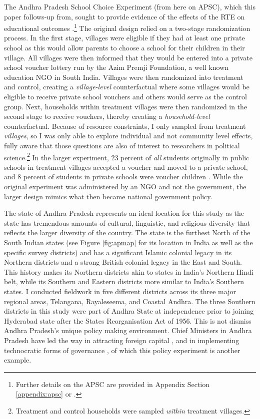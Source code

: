 \documentclass[hidelinks, 12pt, titlepage]{article}
\begin{document}
	The Andhra Pradesh School Choice Experiment (from here on APSC), which this paper follows-up from, sought to provide evidence of the effects of the RTE on educational outcomes \citep[1018-19]{Muralidharan2015}.\footnote{Further details on the APSC are provided in Appendix Section \ref{appendix:apsc} or \cite{Muralidharan2015}.}  The original design relied on a two-stage randomization process.  In the first stage, villages were eligible if they had at least one private school as this would allow parents to choose a school for their children in their village.  All villages were then informed that they would be entered into a private school voucher lottery run by the Azim Premji Foundation, a well known education NGO in South India.  Villages were then randomized into treatment and control, creating a \emph{village-level} counterfactual where some villages would be eligible to receive private school vouchers and others would serve as the control group.  Next, households within treatment villages were then randomized in the second stage to receive vouchers, thereby creating a \emph{household-level} counterfactual.  Because of resource constraints, I only sampled from treatment \emph{villages}, so I was only able to explore individual and not community level effects, fully aware that those questions are also of interest to researchers in political science.\footnote{Treatment and control households were sampled \emph{within} treatment villages.}  In the larger experiment, 23 percent of \emph{all} students originally in public schools in treatment villages accepted a voucher and moved to a private school, and 8 percent of students in private schools were voucher children \citep[1026]{Muralidharan2015}.  While the original experiment was administered by an NGO and not the government, the larger design mimics what then became national government policy.

	The state of Andhra Pradesh represents an ideal location for this study as the state has tremendous amounts of cultural, linguistic, and religious diversity that reflects the larger diversity of the country.  The state is the furthest North of the South Indian states (see Figure \ref{fig:apmap} for its location in India as well as the specific survey districts) and has a significant Islamic colonial legacy in its Northern districts and a strong British colonial legacy in the East and South.  This history makes its Northern districts akin to states in India's Northern Hindi belt, while its Southern and Eastern districts more similar to India's Southern states.  I conducted fieldwork in five different districts across its three major regional areas, Telangana, Rayaleseema, and Coastal Andhra.  The three Southern districts in this study were part of Andhra State at independence prior to joining Hyderabad state after the States Reorganisation Act of 1956.  This is not dismiss Andhra Pradesh's unique policy making environment.  Chief Ministers in Andhra Pradesh have led the way in attracting foreign capital \citep{Rudolph2001}, and in implementing technocratic forms of governance \citep{Bussell2012}, of which this policy experiment is another example.
\end{document}
